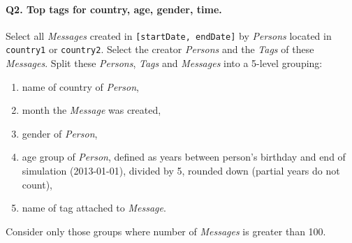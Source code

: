 \paragraph{\textbf{Q2}. Top tags for country, age, gender, time.}
Select all \emph{Messages} created in \texttt{{[}startDate,\ endDate{]}}
by \emph{Persons} located in \texttt{country1} or \texttt{country2}.
Select the creator \emph{Persons} and the \emph{Tags} of these
\emph{Messages}. Split these \emph{Persons}, \emph{Tags} and
\emph{Messages} into a 5-level grouping:
\begin{enumerate}
\def\labelenumi{\arabic{enumi}.}
\tightlist
\item
  name of country of \emph{Person},
\item
  month the \emph{Message} was created,
\item
  gender of \emph{Person},
\item
  age group of \emph{Person}, defined as years between person's birthday
  and end of simulation (2013-01-01), divided by 5, rounded down
  (partial years do not count),
\item
  name of tag attached to \emph{Message}.
\end{enumerate}
Consider only those groups where number of \emph{Messages} is greater
than 100.
